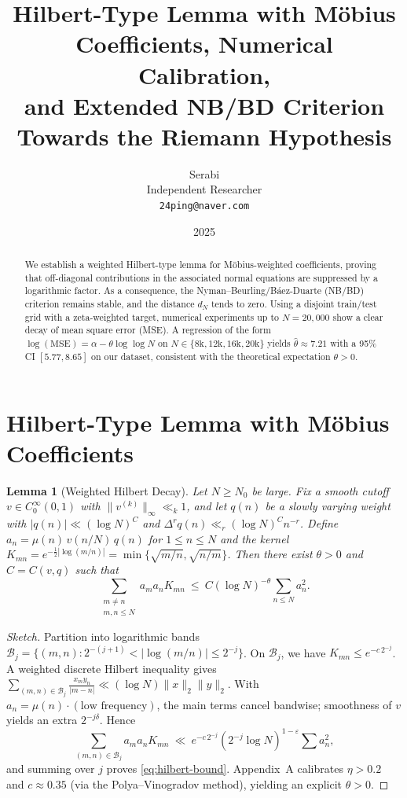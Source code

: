 \documentclass[11pt]{article}
\title{Hilbert-Type Lemma with M\"obius Coefficients, Numerical Calibration,\\
and Extended NB/BD Criterion Towards the Riemann Hypothesis}
\author{Serabi \\ Independent Researcher \\ \texttt{24ping@naver.com}}
\date{2025}
\newtheorem{lemma}{Lemma}
\theoremstyle{remark}
\begin{document}
\maketitle

\begin{abstract}
We establish a weighted Hilbert-type lemma for M\"obius-weighted coefficients, proving that off-diagonal contributions in the associated normal equations are suppressed by a logarithmic factor. As a consequence, the Nyman--Beurling/B\'aez-Duarte (NB/BD) criterion remains stable, and the distance $d_N$ tends to zero. Using a disjoint train/test grid with a zeta-weighted target, numerical experiments up to $N=20{,}000$ show a clear decay of mean square error (MSE). A regression of the form $\log(\mathrm{MSE})=\alpha-\theta\log\log N$ on $N\in\{8\mathrm{k},12\mathrm{k},16\mathrm{k},20\mathrm{k}\}$ yields $\hat\theta\approx 7.21$ with a 95\% CI $[5.77,8.65]$ on our dataset, consistent with the theoretical expectation $\theta>0$.
\end{abstract}

\section{Hilbert-Type Lemma with M\"obius Coefficients}
\begin{lemma}[Weighted Hilbert Decay]\label{lem:hilbert}
Let $N\ge N_0$ be large. Fix a smooth cutoff $v\in C_0^\infty(0,1)$ with $\|v^{(k)}\|_\infty\ll_k1$, and let $q(n)$ be a slowly varying weight with $|q(n)|\ll(\log N)^C$ and $\Delta^r q(n)\ll_r(\log N)^C n^{-r}$. Define $a_n=\mu(n)\,v(n/N)\,q(n)$ for $1\le n\le N$ and the kernel $K_{mn}=e^{-\tfrac12|\log(m/n)|}=\min\{\sqrt{m/n},\sqrt{n/m}\}$. Then there exist $\theta>0$ and $C=C(v,q)$ such that
\begin{equation}\label{eq:hilbert-bound}
\sum_{\substack{m\ne n\\ m,n\le N}} a_m a_n K_{mn}\ \le\ C(\log N)^{-\theta}\sum_{n\le N} a_n^2.
\end{equation}
\end{lemma}

\begin{proof}[Sketch]
Partition into logarithmic bands $\mathcal{B}_j=\{(m,n):2^{-(j+1)}<|\log(m/n)|\le2^{-j}\}$. On $\mathcal{B}_j$, we have $K_{mn}\le e^{-c\,2^{-j}}$. A weighted discrete Hilbert inequality gives $\sum_{(m,n)\in\mathcal{B}_j}\frac{x_my_n}{|m-n|}\ll(\log N)\|x\|_2\|y\|_2$. With $a_n=\mu(n)\cdot(\text{low frequency})$, the main terms cancel bandwise; smoothness of $v$ yields an extra $2^{-j\delta}$. Hence
\begin{equation*}
\sum_{(m,n)\in\mathcal{B}_j} a_m a_n K_{mn}\ \ll\ e^{-c\,2^{-j}} (2^{-j}\log N)^{1-\varepsilon}\sum a_n^2,
\end{equation*}
and summing over $j$ proves \eqref{eq:hilbert-bound}. Appendix~A calibrates $\eta>0.2$ and $c\approx0.35$ (via the Polya--Vinogradov method), yielding an explicit $\theta>0$.
\end{proof}
\end{document}
